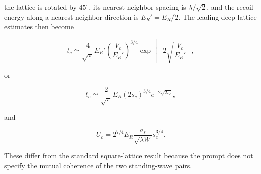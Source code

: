 the lattice is rotated by $45^\circ$, its nearest-neighbor spacing is $\lambda/\sqrt2$, and the recoil energy along a nearest-neighbor direction is $E_R'=E_R/2$. The leading deep-lattice estimates then become

\[
t_c \simeq \frac{4}{\sqrt{\pi}}E_R' \left(\frac{V_c}{E_R'}\right)^{3/4} \exp\!\left[-2\sqrt{\frac{V_c}{E_R'}}\right],
\]

or

\[
t_c \simeq \frac{2}{\sqrt{\pi}}E_R (2s_c)^{3/4}e^{-2\sqrt{2s_c}},
\]

and

\[
U_c = 2^{7/4}E_R \frac{a_s}{\sqrt{\lambda W}} s_c^{3/4}.
\]

These differ from the standard square-lattice result because the prompt does not specify the mutual coherence of the two standing-wave pairs.
